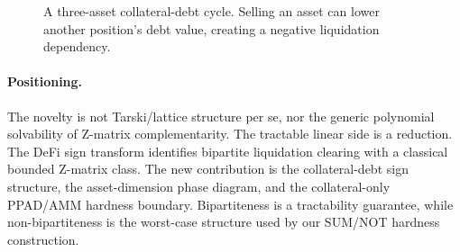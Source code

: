 \documentclass{llncs}
\begin{document}
\begin{figure}[t]
\centering
{}
\caption{A three-asset collateral-debt cycle. Selling an asset can lower another position's debt value, creating a negative liquidation dependency.}
\label{fig:triangle}
\end{figure}

\paragraph{Positioning.}
The novelty is not Tarski/lattice structure per se, nor the generic polynomial solvability of Z-matrix complementarity. The tractable linear side is a reduction. The DeFi sign transform identifies bipartite liquidation clearing with a classical bounded Z-matrix class. The new contribution is the collateral-debt sign structure, the asset-dimension phase diagram, and the collateral-only PPAD/AMM hardness boundary. Bipartiteness is a tractability guarantee, while non-bipartiteness is the worst-case structure used by our SUM/NOT hardness construction.
\end{document}
